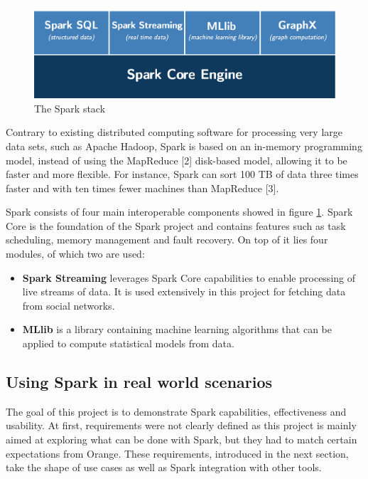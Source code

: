 \documentclass[11pt]{article}
\begin{document}
\begin{figure}[h!]
    \centering
    \includegraphics[scale=0.16]{img/spark-stack.png}
    \caption{The Spark stack}
    \label{spark-stack}
\end{figure}

Contrary to existing distributed computing software for processing very large data sets, such as \textsf{Apache Hadoop}, \textsf{Spark} is based on an in-memory programming model, instead of using the \textsf{MapReduce} [2] disk-based model, allowing it to be faster and more flexible. For instance, \textsf{Spark} can sort 100 TB of data three times faster and with ten times fewer machines than \textsf{MapReduce} [3].
\vspace{9pt}

\textsf{Spark} consists of four main interoperable components showed in figure \ref{spark-stack}.
\textsf{Spark Core} is the foundation of the \textsf{Spark} project and contains features such as task scheduling, memory management and fault recovery. On top of it lies four modules, of which two are used:
\begin{itemize}
    \item \textsf{\textbf{Spark Streaming}} leverages \textsf{Spark Core} capabilities to enable processing of live streams of data. It is used extensively in this project for fetching data from social networks.
    \item \textsf{\textbf{MLlib}} is a library containing machine learning algorithms that can be applied to compute statistical models from data.
\end{itemize}


\subsection{Using Spark in real world scenarios}
The goal of this project is to demonstrate \textsf{Spark} capabilities, effectiveness and usability. At first, requirements were not clearly defined as this project is mainly aimed at exploring what can be done with \textsf{Spark}, but they had to match certain expectations from \textsf{Orange}. These requirements, introduced in the next section, take the shape of use cases as well as \textsf{Spark} integration with other tools.
\end{document}
